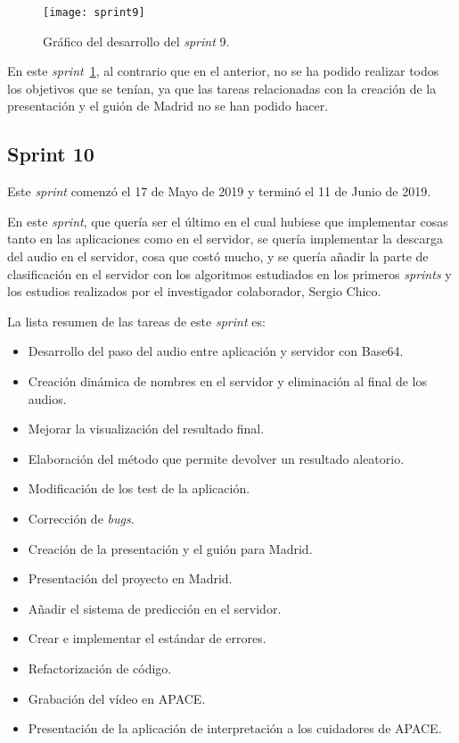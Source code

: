 \begin{figure}
	\centering
	\texttt{[image: sprint9]}
	\caption{Gráfico del desarrollo del \textit{sprint} 9.}
	\label{fig:sprint9}
\end{figure}

En este \textit{sprint}~\ref{fig:sprint9}, al contrario que en el anterior, no se ha podido realizar todos los objetivos que se tenían, ya que las tareas relacionadas con la creación de la presentación y el guión de Madrid no se han podido hacer.

\subsection{Sprint 10}
 Este \textit{sprint} comenzó el 17 de Mayo de 2019 y terminó el 11 de Junio de 2019.
 
 En este \textit{sprint}, que quería ser el último en el cual hubiese que implementar cosas tanto en las aplicaciones como en el servidor, se quería implementar la descarga del audio en el servidor, cosa que costó mucho, y se quería añadir la parte de clasificación en el servidor con los algoritmos estudiados en los primeros \textit{sprints} y los estudios realizados por el investigador colaborador, Sergio Chico.
 
 La lista resumen de las tareas de este \textit{sprint} es:
 \begin{itemize}
 	\item Desarrollo del paso del audio entre aplicación y servidor con Base64.
 	\item Creación dinámica de nombres en el servidor y eliminación al final de los audios.
 	\item Mejorar la visualización del resultado final.
 	\item Elaboración del método que permite devolver un resultado aleatorio.
 	\item Modificación de los test de la aplicación.
 	\item Corrección de \textit{bugs}.
 	\item Creación de la presentación y el guión para Madrid.
 	\item Presentación del proyecto en Madrid.
 	\item Añadir el sistema de predicción en el servidor.
 	\item Crear e implementar el estándar de errores.
 	\item Refactorización de código.
 	\item Grabación del vídeo en APACE.
 	\item Presentación de la aplicación de interpretación a los cuidadores de APACE.
 \end{itemize}

